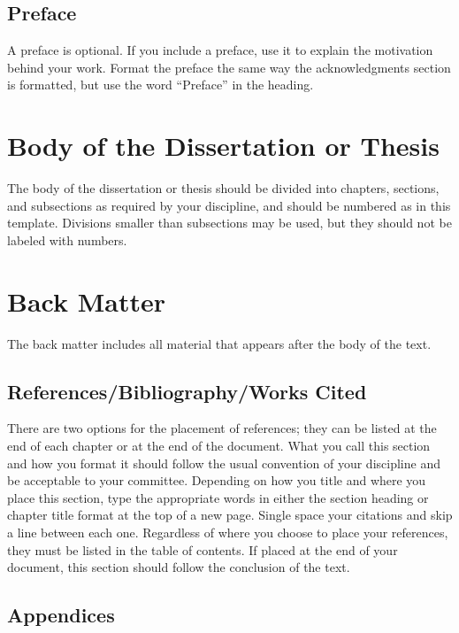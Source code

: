 \subsection{Preface}

A preface is optional.
If you include a preface, use it to explain the motivation behind your work.
Format the preface the same way the acknowledgments section is formatted, but use the word \enquote{Preface} in the heading.

\section{Body of the Dissertation or Thesis}

The body of the dissertation or thesis should be divided into chapters, sections, and subsections as required by your discipline, and should be numbered as in this template.
Divisions smaller than subsections may be used, but they should not be labeled with numbers.

\section{Back Matter}

The back matter includes all material that appears after the body of the text.

\subsection{References/Bibliography/Works Cited}

There are two options for the placement of references; they can be listed at the end of each chapter or at the end of the document.
What you call this section and how you format it should follow the usual convention of your discipline and be acceptable to your committee.
Depending on how you title and where you place this section, type the appropriate words in either the section heading or chapter title format at the top of a new page.
Single space your citations and skip a line between each one.
Regardless of where you choose to place your references, they must be listed in the table of contents.
If placed at the end of your document, this section should follow the conclusion of the text.

\subsection{Appendices}

